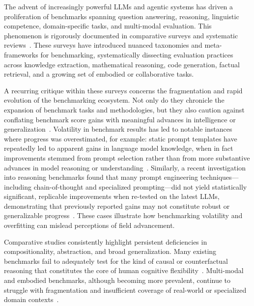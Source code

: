 \documentclass[sigconf]{acmart}
\begin{document}
The advent of increasingly powerful LLMs and agentic systems has driven a proliferation of benchmarks spanning question answering, reasoning, linguistic competence, domain-specific tasks, and multi-modal evaluation. This phenomenon is rigorously documented in comparative surveys and systematic reviews~\cite{ref1, ref2, ref3, ref4, ref5, ref10, ref11, ref12, ref15, ref20, ref22, ref23, ref31, ref36, ref37, ref38, ref39, ref43, ref46, ref47, ref50, ref55, ref61, ref62, ref63, ref64, ref74, ref75, ref80, ref86, ref87, ref89}. These surveys have introduced nuanced taxonomies and meta-frameworks for benchmarking, systematically dissecting evaluation practices across knowledge extraction, mathematical reasoning, code generation, factual retrieval, and a growing set of embodied or collaborative tasks.

A recurring critique within these surveys concerns the fragmentation and rapid evolution of the benchmarking ecosystem. Not only do they chronicle the expansion of benchmark tasks and methodologies, but they also caution against conflating benchmark score gains with meaningful advances in intelligence or generalization~\cite{ref3, ref5, ref11, ref36, ref38}. Volatility in benchmark results has led to notable instances where progress was overestimated, for example: static prompt templates have repeatedly led to apparent gains in language model knowledge, when in fact improvements stemmed from prompt selection rather than from more substantive advances in model reasoning or understanding~\cite{ref98, ref99}. Similarly, a recent investigation into reasoning benchmarks found that many prompt engineering techniques---including chain-of-thought and specialized prompting---did not yield statistically significant, replicable improvements when re-tested on the latest LLMs, demonstrating that previously reported gains may not constitute robust or generalizable progress~\cite{ref22}. These cases illustrate how benchmarking volatility and overfitting can mislead perceptions of field advancement.

Comparative studies consistently highlight persistent deficiencies in compositionality, abstraction, and broad generalization. Many existing benchmarks fail to adequately test for the kind of causal or counterfactual reasoning that constitutes the core of human cognitive flexibility~\cite{ref92, ref94, ref96, ref97, ref98, ref99}. Multi-modal and embodied benchmarks, although becoming more prevalent, continue to struggle with fragmentation and insufficient coverage of real-world or specialized domain contexts~\cite{ref92, ref94, ref95}.
\end{document}
